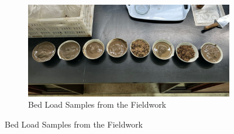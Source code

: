 \begin{figure}[H]
    \centering

    \begin{subfigure}{0.7\textwidth}
        \centering
        \includegraphics[width=\linewidth]{figures/appendixE/soilsamples.jpg}
        \caption{Bed Load Samples from the Fieldwork}
    \end{subfigure}

    \par\vspace{0.5cm} %


\end{figure}
